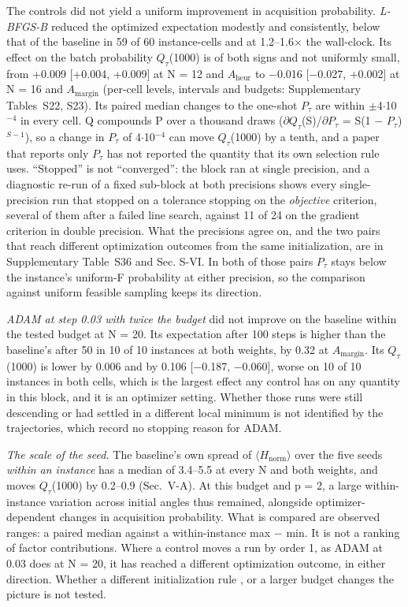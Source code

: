 \documentclass[journal]{IEEEtran}
\begin{document}
The controls did not yield a uniform improvement in acquisition probability. \textit{L-BFGS-B} reduced the optimized expectation modestly and consistently, below that of the baseline in 59 of 60 instance-cells and at 1.2--1.6$\times$ the wall-clock. Its effect on the batch probability $Q_{\tau}$(1000) is of both signs and not uniformly small, from +0.009 [+0.004, +0.009] at N = 12 and $A_{\mathrm{heur}}$ to $-$0.016 [$-$0.027, +0.002] at N = 16 and $A_{\mathrm{margin}}$ (per-cell levels, intervals and budgets: Supplementary Tables~S22, S23). Its paired median changes to the one-shot $P_{\tau}$ are within $\pm$4$\cdot$10$^{-4}$ in every cell. Q compounds P over a thousand draws ($\partial$$Q_{\tau}$(S)/$\partial$$P_{\tau}$ = S(1 $-$ $P_{\tau}$)$^{S-1}$), so a change in $P_{\tau}$ of 4$\cdot$10$^{-4}$ can move $Q_{\tau}$(1000) by a tenth, and a paper that reports only $P_{\tau}$ has not reported the quantity that its own selection rule uses. ``Stopped'' is not ``converged'': the block ran at single precision, and a diagnostic re-run of a fixed sub-block at both precisions shows every single-precision run that stopped on a tolerance stopping on the \textit{objective} criterion, several of them after a failed line search, against 11 of 24 on the gradient criterion in double precision. What the precisions agree on, and the two pairs that reach different optimization outcomes from the same initialization, are in Supplementary Table~S36 and Sec. S-VI. In both of those pairs $P_{\tau}$ stays below the instance's uniform-F probability at either precision, so the comparison against uniform feasible sampling keeps its direction.


\textit{ADAM at step 0.03 with twice the budget} did not improve on the baseline within the tested budget at N = 20. Its expectation after 100 steps is higher than the baseline's after 50 in 10 of 10 instances at both weights, by 0.32 at $A_{\mathrm{margin}}$. Its $Q_{\tau}$(1000) is lower by 0.006 and by 0.106 [$-$0.187, $-$0.060], worse on 10 of 10 instances in both cells, which is the largest effect any control has on any quantity in this block, and it is an optimizer setting. Whether those runs were still descending or had settled in a different local minimum is not identified by the trajectories, which record no stopping reason for ADAM.


\textit{The scale of the seed.} The baseline's own spread of $\langle$$H_{\mathrm{norm}}$$\rangle$ over the five seeds \textit{within an instance} has a median of 3.4--5.5 at every N and both weights, and moves $Q_{\tau}$(1000) by 0.2--0.9 (Sec.~V-A). At this budget and p = 2, a large within-instance variation across initial angles thus remained, alongside optimizer-dependent changes in acquisition probability. What is compared are observed ranges: a paired median against a within-instance max $-$ min. It is not a ranking of factor contributions. Where a control moves a run by order 1, as ADAM at 0.03 does at N = 20, it has reached a different optimization outcome, in either direction. Whether a different initialization rule \cite{ref32}, \cite{ref33} or a larger budget changes the picture is not tested.
\end{document}
